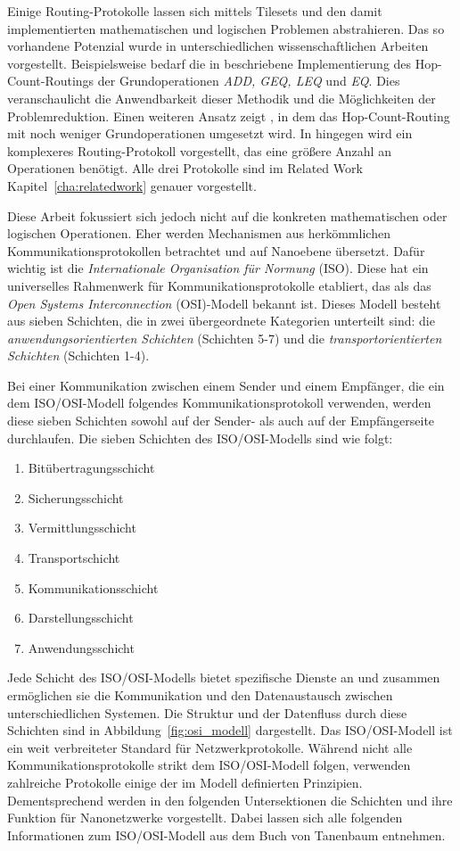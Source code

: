 Einige Routing-Protokolle lassen sich mittels Tilesets und den damit implementierten mathematischen und logischen Problemen abstrahieren. Das so vorhandene Potenzial wurde in unterschiedlichen wissenschaftlichen Arbeiten vorgestellt. Beispielsweise bedarf die in \cite{buether2018hop} beschriebene Implementierung des Hop-Count-Routings der Grundoperationen \emph{ADD, GEQ, LEQ} und \emph{EQ}. Dies veranschaulicht die Anwendbarkeit dieser Methodik und die Möglichkeiten der Problemreduktion. Einen weiteren Ansatz zeigt \cite{tsioliaridou2015corona}, in dem das Hop-Count-Routing mit noch weniger Grundoperationen umgesetzt wird. In \cite{liaskos2016routing} hingegen wird ein komplexeres Routing-Protokoll vorgestellt, das eine größere Anzahl an Operationen benötigt. Alle drei Protokolle sind im Related Work Kapitel~\ref{cha:relatedwork} genauer vorgestellt.

Diese Arbeit fokussiert sich jedoch nicht auf die konkreten mathematischen oder logischen Operationen. Eher werden Mechanismen aus herkömmlichen Kommunikationsprotokollen betrachtet und auf Nanoebene übersetzt. Dafür wichtig ist die \emph{Internationale Organisation für Normung} (ISO). Diese hat ein universelles Rahmenwerk für Kommunikationsprotokolle etabliert, das als das \emph{Open Systems Interconnection} (OSI)-Modell bekannt ist. Dieses Modell besteht aus sieben Schichten, die in zwei übergeordnete Kategorien unterteilt sind: die \emph{anwendungsorientierten Schichten} (Schichten 5-7) und die \emph{transportorientierten Schichten} (Schichten 1-4). \cite{iso1984}

Bei einer Kommunikation zwischen einem Sender und einem Empfänger, die ein dem ISO/OSI-Modell folgendes Kommunikationsprotokoll verwenden, werden diese sieben Schichten sowohl auf der Sender- als auch auf der Empfängerseite durchlaufen. Die sieben Schichten des ISO/OSI-Modells sind wie folgt:
\begin{enumerate}
	\item Bitübertragungsschicht
	\item Sicherungsschicht
	\item Vermittlungsschicht
	\item Transportschicht
	\item Kommunikationsschicht
	\item Darstellungsschicht
	\item Anwendungsschicht
\end{enumerate}

Jede Schicht des ISO/OSI-Modells bietet spezifische Dienste an und zusammen ermöglichen sie die Kommunikation und den Datenaustausch zwischen unterschiedlichen Systemen. Die Struktur und der Datenfluss durch diese Schichten sind in Abbildung~\ref{fig:osi_modell} dargestellt. Das ISO/OSI-Modell ist ein weit verbreiteter Standard für Netzwerkprotokolle. Während nicht alle Kommunikationsprotokolle strikt dem ISO/OSI-Modell folgen, verwenden zahlreiche Protokolle einige der im Modell definierten Prinzipien. Dementsprechend werden in den folgenden Untersektionen die Schichten und ihre Funktion für Nanonetzwerke vorgestellt. Dabei lassen sich alle folgenden Informationen zum ISO/OSI-Modell aus dem Buch von Tanenbaum entnehmen. \cite{tanenbaum2011computer}

